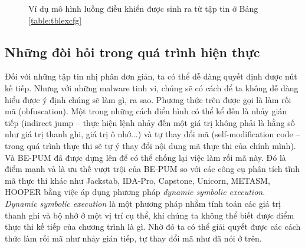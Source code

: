 \begin{figure}
\centering
{}
\caption{Ví dụ mô hình luồng điều khiển được sinh ra từ tập tin ở Bảng \ref {table:tblexcfg}} 
\label{fig:imgexcfg}
\end{figure}


	\subsection{Những đòi hỏi trong quá trình hiện thực}

Đối với những tập tin nhị phân đơn giản, ta có thể dễ dàng quyết định được nút kế tiếp. Nhưng với những malware tinh vi, chúng sẽ có cách để ta không dễ dàng hiểu được ý định chúng sẽ làm gì, ra sao. Phương thức trên được gọi là làm rối mã (obfuscation). Một trong những cách điển hình có thể kể đến là nhảy gián tiếp (indirect jump -- thực hiện lệnh nhảy đến một giá trị không phải là hằng số như giá trị thanh ghi, giá trị ô nhớ...) và tự thay đổi mã (self-modification code -- trong quá trình thực thi sẽ tự ý thay đổi nội dung mã thực thi của chính mình).\\

Và BE-PUM đã được dựng lên để có thể chống lại việc làm rối mã này. Đó là điểm mạnh và là ưu thế vượt trội của BE-PUM so với các công cụ phân tích tĩnh mã thực thi khác như Jackstab, IDA-Pro, Capstone, Unicorn, METASM, HOOPER bằng việc áp dụng phương pháp \textit{dynamic symbolic execution}.\\

\textit{Dynamic symbolic execution} là một phương pháp nhằm tính toán các giá trị thanh ghi và bộ nhớ ở một vị trí cụ thể, khi chúng ta không thể biết được điểm thực thi kế tiếp của chương trình là gì. Nhờ đó ta có thể giải quyết được các cách thức làm rối mã như nhảy gián tiếp, tự thay đổi mã như đã nói ở trên.\\

